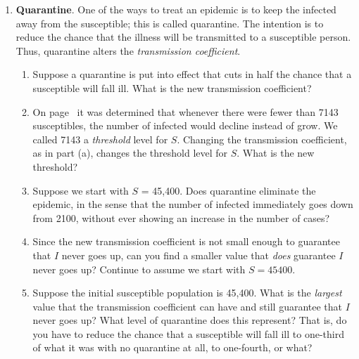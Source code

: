 \begin{enumerate}
\begin{enumerate}
  \item Which process leads to a {\em smaller\/} set of differences: a
single round of calculations with $\Delta t = \pm 2$, or two rounds of
calculations with $\Delta t = \pm 1$?  Consequently, which process
produces better estimates---in the sense in which we used to measure
estimates on page~\pageref{`differences'}?



\end{enumerate}
\item {\bf Quarantine}. One of the ways to treat an
epidemic is to keep the infected away from the susceptible; this is
called quarantine.  The intention is to reduce the chance that the
illness will be transmitted to a susceptible person.  Thus, quarantine
alters the {\em transmission coefficient}.

  \begin{enumerate}
  \item Suppose a quarantine is put into effect that cuts in half the
chance that a susceptible will fall ill.  What is the new transmission
coefficient?

  \item On page~\pageref{`threshold'} it was determined that whenever
there were fewer than 7143 susceptibles, the number of infected would
decline instead of grow.  We called 7143 a {\em
  threshold\/} level for $S$.  Changing the
transmission coefficient, as in part (a), changes the threshold level
for $S$.  What is the new threshold?

  \item Suppose we start with $S$ = 45,400.  Does quarantine eliminate
the epidemic, in the sense that the number of infected immediately
goes down from 2100, without ever showing an increase in the number of
cases?

  \item Since the new transmission coefficient is not small enough to
guarantee that $I$ never goes up, can you find a smaller value that
{\em does\/} guarantee $I$ never goes up?  Continue to assume we start
with $S = 45400$.

  \item Suppose the initial susceptible population is 45,400.  What is
the {\em largest\/} value that the transmission coefficient can have
and still guarantee that $I$ never goes up?  What level of quarantine
does this represent?  That is, do you have to reduce the chance that a
susceptible will fall ill to one-third of what it was with no
quarantine at all, to one-fourth, or what?


\end{enumerate}
\end{enumerate}
